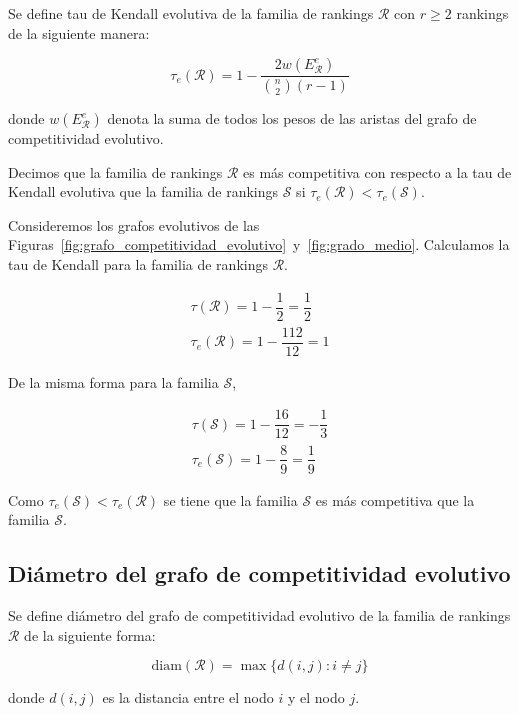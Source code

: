 \begin{defi}
Se define tau de Kendall evolutiva de la familia de rankings $\mathcal{R}$ con $r \geq 2$ rankings de la siguiente manera:

\begin{equation}
\tau_e(\mathcal{R}) = 1 - \dfrac{2 w(E_\mathcal{R}^e)}{\binom{n}{2}(r-1)}
\end{equation} 

donde $w(E_\mathcal{R}^e)$ denota la suma de todos los pesos de las aristas del grafo de competitividad evolutivo.
\end{defi}

\begin{defi}
Decimos que la familia de rankings $\mathcal{R}$ es más competitiva con respecto a la tau de Kendall evolutiva que la familia de rankings $\mathcal{S}$ si $\tau_e(\mathcal{R}) < \tau_e(\mathcal{S})$.
\end{defi}

\begin{ejemplo}
Consideremos los grafos evolutivos de las Figuras~\ref{fig:grafo_competitividad_evolutivo}~y~\ref{fig:grado_medio}. Calculamos la tau de Kendall para la familia de rankings $\mathcal{R}$.

\begin{eqnarray}
\tau(\mathcal{R}) = 1 - \dfrac{1}{2} = \dfrac{1}{2}\\
\tau_e(\mathcal{R}) = 1 - \dfrac{112}{12} = 1
\end{eqnarray}

De la misma forma para la familia $\mathcal{S}$,

\begin{eqnarray}
\tau(\mathcal{S}) = 1 - \dfrac{16}{12} = -\dfrac{1}{3}\\
\tau_e(\mathcal{S}) = 1 - \dfrac{8}{9} = \dfrac{1}{9}
\end{eqnarray}

Como $\tau_e(\mathcal{S}) < \tau_e(\mathcal{R})$ se tiene que la familia $\mathcal{S}$ es más competitiva que la familia $\mathcal{S}$.

\end{ejemplo}

\subsection*{Diámetro del grafo de competitividad evolutivo}

\begin{defi}
Se define diámetro del grafo de competitividad evolutivo de la familia de rankings $\mathcal{R}$ de la siguiente forma:

\begin{equation}
\mathrm{diam}(\mathcal{R}) = \max \{ d(i,j) : i \neq j \}
\end{equation}

donde $d(i,j)$ es la distancia entre el nodo $i$ y el nodo $j$.
\end{defi}

